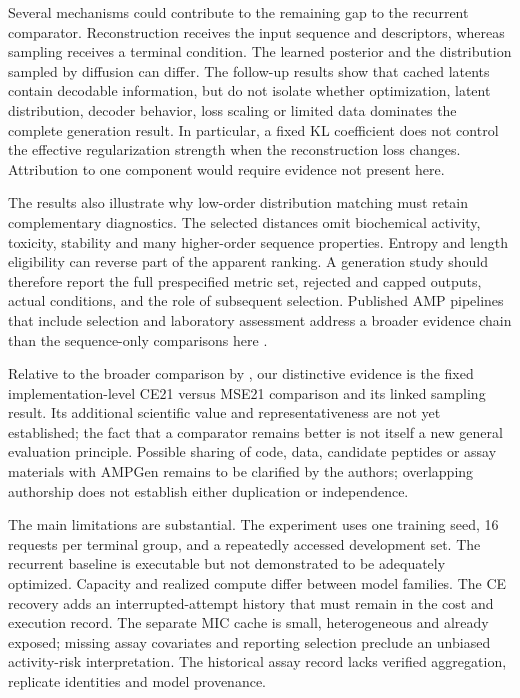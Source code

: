 \documentclass[12pt,a4paper]{article}
\begin{document}
Several mechanisms could contribute to the remaining gap to the recurrent comparator. Reconstruction receives the input sequence and descriptors, whereas sampling receives a terminal condition. The learned posterior and the distribution sampled by diffusion can differ. The follow-up results show that cached latents contain decodable information, but do not isolate whether optimization, latent distribution, decoder behavior, loss scaling or limited data dominates the complete generation result. In particular, a fixed KL coefficient does not control the effective regularization strength when the reconstruction loss changes. Attribution to one component would require evidence not present here.

The results also illustrate why low-order distribution matching must retain complementary diagnostics. The selected distances omit biochemical activity, toxicity, stability and many higher-order sequence properties. Entropy and length eligibility can reverse part of the apparent ranking. A generation study should therefore report the full prespecified metric set, rejected and capped outputs, actual conditions, and the role of subsequent selection. Published AMP pipelines that include selection and laboratory assessment address a broader evidence chain than the sequence-only comparisons here \citep{szymczak2023}.

Relative to the broader comparison by \citet{beierle2026}, our distinctive evidence is the fixed implementation-level CE21 versus MSE21 comparison and its linked sampling result. Its additional scientific value and representativeness are not yet established; the fact that a comparator remains better is not itself a new general evaluation principle. Possible sharing of code, data, candidate peptides or assay materials with AMPGen remains to be clarified by the authors; overlapping authorship does not establish either duplication or independence.

The main limitations are substantial. The experiment uses one training seed, 16 requests per terminal group, and a repeatedly accessed development set. The recurrent baseline is executable but not demonstrated to be adequately optimized. Capacity and realized compute differ between model families. The CE recovery adds an interrupted-attempt history that must remain in the cost and execution record. The separate MIC cache is small, heterogeneous and already exposed; missing assay covariates and reporting selection preclude an unbiased activity-risk interpretation. The historical assay record lacks verified aggregation, replicate identities and model provenance.
\end{document}

